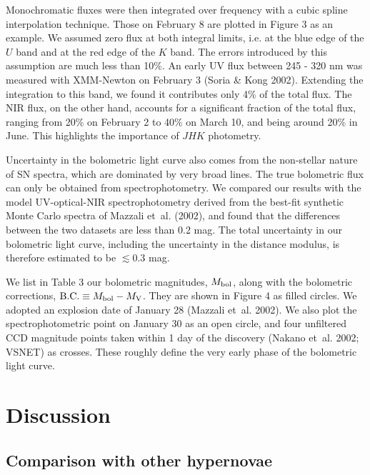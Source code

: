 \documentclass[10pt,preprint2]{aastex}
\begin{document}
Monochromatic fluxes were then integrated over frequency with a
cubic spline interpolation technique. Those on February 8 are
plotted in Figure 3 as an example. We assumed zero flux at both
integral limits, i.e. at the blue edge of the $U$ band and at the
red edge of the $K$ band. The errors introduced by this assumption
are much less than 10\%. An early UV flux between 245 - 320 nm was
measured with XMM-Newton on February 3 (Soria \& Kong 2002).
Extending the integration to this band, we found it contributes
only 4\% of the total flux. The NIR flux, on the other hand,
accounts for a significant fraction of the total flux, ranging
from 20\% on February 2 to 40\% on March 10, and being around 20\%
in June. This highlights the importance of $JHK$ photometry.

Uncertainty in the bolometric light curve also comes from the
non-stellar nature of SN spectra, which are dominated by very
broad lines.  The true bolometric flux can only be obtained
from spectrophotometry.  We compared our results with the model
UV-optical-NIR spectrophotometry derived from the best-fit
synthetic Monte Carlo spectra of Mazzali et~al. (2002), and found
that the differences between the two datasets are less than
0.2 mag.  The total uncertainty in our bolometric light curve,
including the uncertainty in the distance modulus, is therefore
estimated to be $\lesssim 0.3$ mag.

We list in Table 3 our bolometric magnitudes, $M_{\rm bol}$,
along with the bolometric corrections, ${\rm B.C.}\equiv M_{\rm
bol}-M_{\rm V}$. They are shown in Figure 4 as filled circles.
We adopted an explosion date of January 28 (Mazzali et~al. 2002).
We also plot the spectrophotometric point on January 30 as
an open circle, and four unfiltered CCD magnitude points taken
within 1 day of the discovery (Nakano et~al. 2002; VSNET) as crosses.
These roughly define the very early phase of the bolometric light curve.

\section{Discussion}

\subsection{Comparison with other hypernovae}
\end{document}
